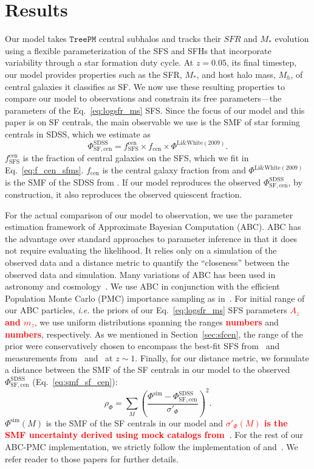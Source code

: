 \documentclass[12pt, letterpaper, preprint]{aastex}
\newcommand{\todo}[1]{{\bf \textcolor{red}{#1}}}
\newcommand{\beq}{\begin{equation}}
\newcommand{\eeq}{\end{equation}}
\begin{document}
\section{Results}
Our model takes $\mathtt{TreePM}$ central subhalos and tracks their $SFR$ 
and $M_*$ evolution using a flexible parameterization of the SFS and 
SFHs that incorporate variability through a star formation duty cycle.
At $z = 0.05$, its final timestep, our model provides properties such 
as the SFR, $M_*$, and host halo mass, $M_h$, of central galaxies it 
classifies as SF. We now use these resulting properties to compare our 
model to observations and constrain its free parameters---the parameters 
of the Eq.~\ref{eq:logsfr_ms} SFS. Since the focus of our model and this 
paper is on SF centrals, the main observable we use is the SMF of star 
forming centrals in SDSS, which we estimate as 
\beq \label{eq:smf_sf_cen} 
\Phi^\mathrm{SDSS}_\mathrm{SF,cen} = f^\mathrm{cen}_\mathrm{SFS} \times f_\mathrm{cen} \times \Phi^\mathrm{Li\&White(2009)}.
\eeq
$f^\mathrm{cen}_\mathrm{SFS}$ is the fraction of central galaxies on the 
SFS, which we fit in Eq.~\ref{eq:f_cen_sfms}. $f_\mathrm{cen}$ is the 
central galaxy fraction from \cite{wetzel2013} and $\Phi^\mathrm{Li\&White(2009)}$ 
is the SMF of the SDSS from \cite{li2009}. If our model reproduces the 
observed $\Phi^\mathrm{SDSS}_\mathrm{SF,cen}$, by construction, it also 
reproduces the observed quiescent fraction. 

For the actual comparison of our model to observation, we use the parameter 
estimation framework of Approximate Bayesian Computation (ABC). ABC has the 
advantage over standard approaches to parameter inference in that it does not 
require evaluating the likelihood. It relies only on a simulation of the observed 
data and a distance metric to quantify the ``closeness'' between the observed data
and simulation. Many variations of ABC has been used in astronomy and 
cosmology~\citep[\emph{e.g.}][]{cameron2012,weyant2013,ishida2015,alsing2018}. 
We use ABC in conjunction with the efficient Population Monte Carlo (PMC)
importance sampling as in~\citep{hahn2016, hahn2017}. For initial range of our
ABC particles, \emph{i.e.} the priors of our Eq.~\ref{eq:logsfr_ms} SFS parameters
\todo{$A_z$ and $m_z$}, we use uniform distributions spanning the ranges 
\todo{numbers} and \todo{numbers}, respectively. As we mentioned in Section~\ref{sec:sfcen}, 
the range of the prior were conservatively chosen to encompass the best-fit SFS from~\cite{speagle2014} 
and measurements from~\cite{moustakas2013} and~\cite{lee2015} at $z \sim 1$. 
Finally, for our distance metric, we formulate a distance between the SMF of
the SF centrals in our model to the observed $\Phi^\mathrm{SDSS}_\mathrm{SF,cen}$ 
(Eq.~\ref{eq:smf_sf_cen}): 
\beq
\rho_\Phi = \sum\limits_{M} \left( \frac{\Phi^\mathrm{sim} - \Phi^\mathrm{SDSS}_\mathrm{SF,cen}}{\sigma'_\Phi}\right)^2.
\eeq
$\Phi^\mathrm{sim}(M)$ is the SMF of the SF centrals in our model and 
\todo{$\sigma'_\Phi(M)$ is the SMF uncertainty derived using mock catalogs from~\cite{li2009}}. 
For the rest of our ABC-PMC implementation, we strictly follow the implementation 
of \cite{hahn2017b} and~\cite{hahn2017a}. We refer reader to those papers for 
further details.
\end{document}
